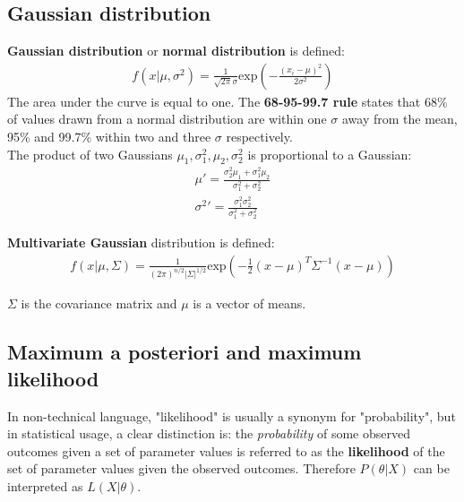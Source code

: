 \documentclass{report}
\begin{document}
\subsection{Gaussian distribution}
{\bf Gaussian distribution} or {\bf normal distribution} is defined:
\begin{align*}
f(x\vert \mu,\sigma^2)= \frac{1}{\sqrt{2\pi}\sigma}\mbox{exp}(-\frac{(x_i-\mu)^2}{2\sigma^2})
\end{align*}
The area under the curve is equal to one. The {\bf 68-95-99.7 rule} states that 68\% of values drawn from a normal distribution are within one $\sigma$ away from the mean, 95\% and 99.7\% within two and three $\sigma$ respectively.
\\
The product of two Gaussians $\mu_1, \sigma_1^2, \mu_2, \sigma_2^2$ is proportional to a Gaussian:
\begin{align*}
\mu\prime = \frac{\sigma_2^2\mu_1 + \sigma_1^2\mu_2}{\sigma_1^2 + \sigma_2^2} \\
\sigma^{2}\prime = \frac{\sigma_1^2\sigma_2^2}{\sigma_1^2+\sigma_2^2}
\end{align*}


{\bf Multivariate Gaussian} distribution is defined:
\begin{align*}
f(x\vert \mu,\Sigma)=\frac{1}{(2\pi)^{n/2}\vert \Sigma \vert ^{1/2}}\mbox{exp}(-\frac{1}{2}(x-\mu)^T \Sigma^{-1}(x-\mu))
\end{align*}

$\Sigma$ is the covariance matrix and $\mu$ is a vector of means.

\subsection{Maximum a posteriori and maximum likelihood}
\label{ref:estimationsection}
In non-technical language, "likelihood" is usually a synonym for "probability", but in statistical usage, a clear distinction is: the {\em probability} of some observed outcomes given a set of parameter values is referred to as the {\bf likelihood} of the set of parameter values given the observed outcomes. Therefore $P(\theta\vert X)$ can be interpreted as $L(X\vert\theta)$.
\end{document}
